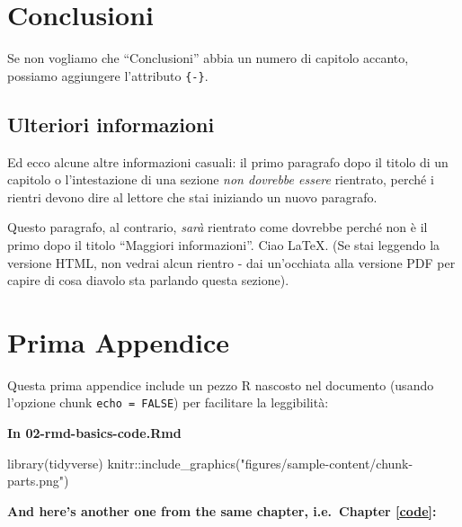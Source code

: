 \documentclass[a4paper, 11pt, nobind]{templates/ociamthesis}
\newenvironment{Shaded}{\begin{snugshade}}{\end{snugshade}}
\newcommand{\FunctionTok}[1]{\textcolor[rgb]{0.00,0.00,0.00}{#1}}
\newcommand{\NormalTok}[1]{#1}
\newcommand{\SpecialCharTok}[1]{\textcolor[rgb]{0.00,0.00,0.00}{#1}}
\newcommand{\StringTok}[1]{\textcolor[rgb]{0.31,0.60,0.02}{#1}}
\renewenvironment{Shaded}
{
  \vspace{10pt}%
  \begin{snugshade}%
}{%
  \end{snugshade}%
  \vspace{8pt}%
}
\begin{document}
\hypertarget{conclusioni}{%
\chapter*{Conclusioni}\label{conclusioni}}

Se non vogliamo che ``Conclusioni'' abbia un numero di capitolo accanto, possiamo aggiungere l'attributo \texttt{\{-\}}.

\hypertarget{ulteriori-informazioni}{%
\section*{Ulteriori informazioni}\label{ulteriori-informazioni}}

Ed ecco alcune altre informazioni casuali:
il primo paragrafo dopo il titolo di un capitolo o l'intestazione di una sezione \emph{non dovrebbe essere} rientrato, perché i rientri devono dire al lettore che stai iniziando un nuovo paragrafo.

Questo paragrafo, al contrario, \emph{sarà} rientrato come dovrebbe perché non è il primo dopo il titolo ``Maggiori informazioni''.
Ciao LaTeX. (Se stai leggendo la versione HTML, non vedrai alcun rientro - dai un'occhiata alla versione PDF per capire di cosa diavolo sta parlando questa sezione).

\startappendices

\hypertarget{prima-appendice}{%
\chapter{Prima Appendice}\label{prima-appendice}}

Questa prima appendice include un pezzo R nascosto nel documento (usando l'opzione chunk \texttt{echo\ =\ FALSE}) per facilitare la leggibilità:

\textbf{In 02-rmd-basics-code.Rmd}

\begin{Shaded}
\begin{Highlighting}[]
\FunctionTok{library}\NormalTok{(tidyverse)}
\NormalTok{knitr}\SpecialCharTok{::}\FunctionTok{include\_graphics}\NormalTok{(}\StringTok{"figures/sample{-}content/chunk{-}parts.png"}\NormalTok{)}
\end{Highlighting}
\end{Shaded}

\textbf{And here's another one from the same chapter, i.e.~Chapter \ref{code}:}
\end{document}

